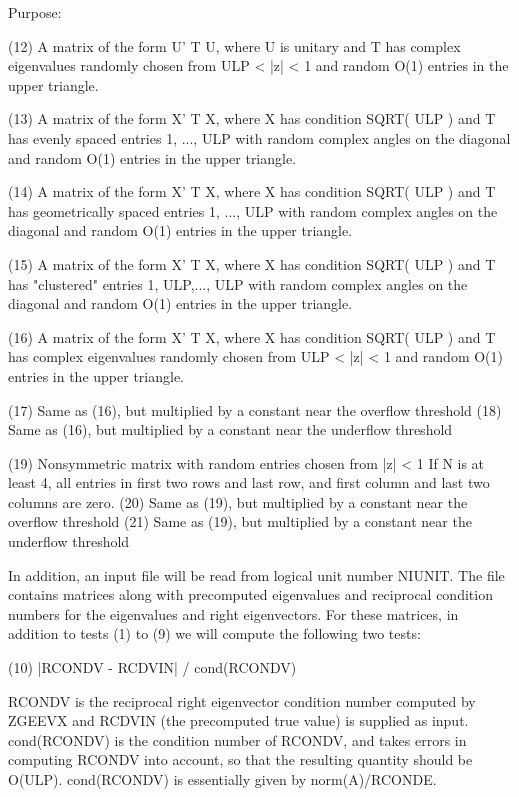\begin{DoxyParagraph}{Purpose\+: }
\begin{DoxyVerb}
    (12) A matrix of the form  U' T U, where U is unitary and
         T has complex eigenvalues randomly chosen from
         ULP < |z| < 1   and random O(1) entries in the upper
         triangle.

    (13) A matrix of the form  X' T X, where X has condition
         SQRT( ULP ) and T has evenly spaced entries 1, ..., ULP
         with random complex angles on the diagonal and random O(1)
         entries in the upper triangle.

    (14) A matrix of the form  X' T X, where X has condition
         SQRT( ULP ) and T has geometrically spaced entries
         1, ..., ULP with random complex angles on the diagonal
         and random O(1) entries in the upper triangle.

    (15) A matrix of the form  X' T X, where X has condition
         SQRT( ULP ) and T has "clustered" entries 1, ULP,..., ULP
         with random complex angles on the diagonal and random O(1)
         entries in the upper triangle.

    (16) A matrix of the form  X' T X, where X has condition
         SQRT( ULP ) and T has complex eigenvalues randomly chosen
         from ULP < |z| < 1 and random O(1) entries in the upper
         triangle.

    (17) Same as (16), but multiplied by a constant
         near the overflow threshold
    (18) Same as (16), but multiplied by a constant
         near the underflow threshold

    (19) Nonsymmetric matrix with random entries chosen from |z| < 1
         If N is at least 4, all entries in first two rows and last
         row, and first column and last two columns are zero.
    (20) Same as (19), but multiplied by a constant
         near the overflow threshold
    (21) Same as (19), but multiplied by a constant
         near the underflow threshold

    In addition, an input file will be read from logical unit number
    NIUNIT. The file contains matrices along with precomputed
    eigenvalues and reciprocal condition numbers for the eigenvalues
    and right eigenvectors. For these matrices, in addition to tests
    (1) to (9) we will compute the following two tests:

   (10)  |RCONDV - RCDVIN| / cond(RCONDV)

      RCONDV is the reciprocal right eigenvector condition number
      computed by ZGEEVX and RCDVIN (the precomputed true value)
      is supplied as input. cond(RCONDV) is the condition number of
      RCONDV, and takes errors in computing RCONDV into account, so
      that the resulting quantity should be O(ULP). cond(RCONDV) is
      essentially given by norm(A)/RCONDE.


\end{DoxyVerb}
\end{DoxyParagraph}
